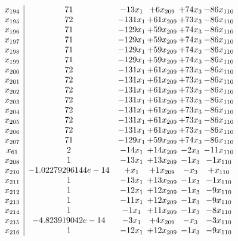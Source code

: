 \documentclass[11pt]{article}
\begin{document}
\[\begin{array}{c| c c@{\hskip 2pt} c@{\hskip 2pt} c@{\hskip 2pt} c@{\hskip 2pt} }
 x_{194}   &  71 & -13 x_{1} & + 6 x_{209} & + 74 x_{3} & -86 x_{110}\\
 x_{195}   &  72 & -131 x_{1} & + 61 x_{209} & + 73 x_{3} & -86 x_{110}\\
 x_{196}   &  71 & -129 x_{1} & + 59 x_{209} & + 74 x_{3} & -86 x_{110}\\
 x_{197}   &  71 & -129 x_{1} & + 59 x_{209} & + 74 x_{3} & -86 x_{110}\\
 x_{198}   &  71 & -129 x_{1} & + 59 x_{209} & + 74 x_{3} & -86 x_{110}\\
 x_{199}   &  71 & -129 x_{1} & + 59 x_{209} & + 74 x_{3} & -86 x_{110}\\
 x_{200}   &  72 & -131 x_{1} & + 61 x_{209} & + 73 x_{3} & -86 x_{110}\\
 x_{201}   &  72 & -131 x_{1} & + 61 x_{209} & + 73 x_{3} & -86 x_{110}\\
 x_{202}   &  72 & -131 x_{1} & + 61 x_{209} & + 73 x_{3} & -86 x_{110}\\
 x_{203}   &  72 & -131 x_{1} & + 61 x_{209} & + 73 x_{3} & -86 x_{110}\\
 x_{204}   &  72 & -131 x_{1} & + 61 x_{209} & + 73 x_{3} & -86 x_{110}\\
 x_{205}   &  72 & -131 x_{1} & + 61 x_{209} & + 73 x_{3} & -86 x_{110}\\
 x_{206}   &  72 & -131 x_{1} & + 61 x_{209} & + 73 x_{3} & -86 x_{110}\\
 x_{207}   &  71 & -129 x_{1} & + 59 x_{209} & + 74 x_{3} & -86 x_{110}\\
 x_{61}   &  2 & -14 x_{1} & + 14 x_{209} & -2 x_{3} & -11 x_{110}\\
 x_{208}   &  1 & -13 x_{1} & + 13 x_{209} & -1 x_{3} & -1 x_{110}\\
 x_{210}   &  -1.02279296144e-14 & +  x_{1} & + 1 x_{209} & - x_{3} & +  x_{110}\\
 x_{211}   &  1 & -13 x_{1} & + 13 x_{209} & -1 x_{3} & -1 x_{110}\\
 x_{212}   &  1 & -12 x_{1} & + 12 x_{209} & -1 x_{3} & -9 x_{110}\\
 x_{213}   &  1 & -11 x_{1} & + 12 x_{209} & -1 x_{3} & -9 x_{110}\\
 x_{214}   &  1 & -1 x_{1} & + 11 x_{209} & -1 x_{3} & -8 x_{110}\\
 x_{215}   &  -4.823919042e-14 & -3 x_{1} & + 4 x_{209} & - x_{3} & -3 x_{110}\\
 x_{216}   &  1 & -12 x_{1} & + 12 x_{209} & -1 x_{3} & -9 x_{110}\\

\end{array}\]
\end{document}
